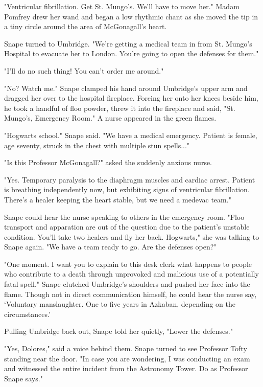 "Ventricular fibrillation. Get St. Mungo's. We'll have to move her." Madam Pomfrey drew her wand and began a low rhythmic chant as she moved the tip in a tiny circle around the area of McGonagall's heart.

Snape turned to Umbridge. "We're getting a medical team in from St. Mungo's Hospital to evacuate her to London. You're going to open the defenses for them."

"I'll do no such thing! You can't order me around."

"No? Watch me." Snape clamped his hand around Umbridge's upper arm and dragged her over to the hospital fireplace. Forcing her onto her knees beside him, he took a handful of floo powder, threw it into the fireplace and said, "St. Mungo's, Emergency Room." A nurse appeared in the green flames.

"Hogwarts school." Snape said. "We have a medical emergency. Patient is female, age seventy, struck in the chest with multiple stun spells..."

"Is this Professor McGonagall?" asked the suddenly anxious nurse.

"Yes. Temporary paralysis to the diaphragm muscles and cardiac arrest. Patient is breathing independently now, but exhibiting signs of ventricular fibrillation. There's a healer keeping the heart stable, but we need a medevac team."

Snape could hear the nurse speaking to others in the emergency room. "Floo transport and apparation are out of the question due to the patient's unstable condition. You'll take two healers and fly her back. Hogwarts," she was talking to Snape again. "We have a team ready to go. Are the defenses open?"

"One moment. I want you to explain to this desk clerk what happens to people who contribute to a death through unprovoked and malicious use of a potentially fatal spell." Snape clutched Umbridge's shoulders and pushed her face into the flame. Though not in direct communication himself, he could hear the nurse say, `Voluntary manslaughter. One to five years in Azkaban, depending on the circumstances.'

Pulling Umbridge back out, Snape told her quietly, "Lower the defenses."

"Yes, Dolores," said a voice behind them. Snape turned to see Professor Tofty standing near the door. "In case you are wondering, I was conducting an exam and witnessed the entire incident from the Astronomy Tower. Do as Professor Snape says."

